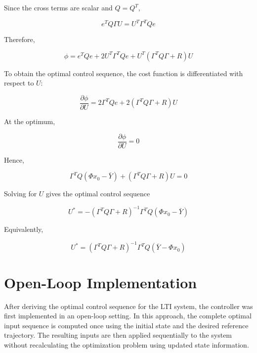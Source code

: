 Since the cross terms are scalar and \(Q=Q^T\),

\begin{equation}
    e^TQ\Gamma U
    =
    U^T\Gamma^TQe
\end{equation}

Therefore,

\begin{equation}
    \phi
    =
    e^TQe
    +
    2U^T\Gamma^TQe
    +
    U^T(\Gamma^TQ\Gamma+R)U
    \label{eq:lti_cost_expanded}
\end{equation}

To obtain the optimal control sequence, the cost function is differentiated with respect to \(U\):

\begin{equation}
    \frac{\partial \phi}{\partial U}
    =
    2\Gamma^TQe
    +
    2(\Gamma^TQ\Gamma+R)U
\end{equation}

At the optimum,

\begin{equation}
    \frac{\partial \phi}{\partial U}=0
\end{equation}

Hence,

\begin{equation}
    \Gamma^TQ(\Phi x_0-\bar{Y})
    +
    (\Gamma^TQ\Gamma+R)U
    =
    0
\end{equation}

Solving for \(U\) gives the optimal control sequence

\begin{equation}
    \boxed{
    U^\ast
    =
    -
    (\Gamma^TQ\Gamma+R)^{-1}
    \Gamma^TQ
    (\Phi x_0-\bar{Y})
    }
    \label{eq:lti_optimal_u}
\end{equation}

Equivalently,

\begin{equation}
    \boxed{
    U^\ast
    =
    (\Gamma^TQ\Gamma+R)^{-1}
    \Gamma^TQ
    (\bar{Y}-\Phi x_0)
    }
\end{equation}

\section{Open-Loop Implementation}
\label{sec:open_loop}

After deriving the optimal control sequence for the LTI system, the controller was first implemented in an open-loop setting. In this approach, the complete optimal input sequence is computed once using the initial state and the desired reference trajectory. The resulting inputs are then applied sequentially to the system without recalculating the optimization problem using updated state information.

